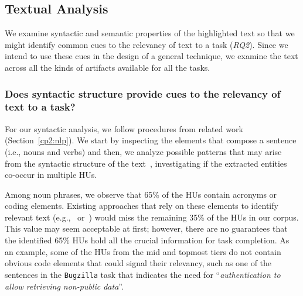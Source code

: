 
\subsection{Textual Analysis}


We examine syntactic and semantic properties 
of the highlighted text so that 
we might identify
common cues to the relevancy of text to a task (\textit{RQ2}).
Since we intend to use these cues 
in the design of a general technique, 
we examine the text across 
all the kinds of artifacts 
available for all the tasks. 




 





\subsubsection{Does syntactic structure provide cues to the relevancy of text to a task?}
\label{cp3:syntactic-analysis}


For our syntactic analysis, we follow procedures from related work (Section~\ref{cp2:nlp}).
We start by inspecting the elements that compose a sentence (i.e., nouns and verbs)
and then, we analyze possible patterns that may arise from the syntactic structure of the text~\cite{Robillard2015},
investigating if the extracted entities co-occur in multiple HUs.






Among noun phrases, we observe that 65\% of the HUs contain acronyms or coding elements.
Existing approaches that rely on these elements to identify relevant text (e.g.,~\cite{Robillard2015} or~\cite{Jiang2016b}) would miss the remaining 35\% of the HUs in our corpus.
This value may seem acceptable at first; however, there are no guarantees that
the identified 65\% HUs hold all the crucial information for task completion.
As an example, some of the HUs from the mid and topmost tiers 
do not contain obvious code elements that could signal their relevancy,
such as one of the sentences in the \texttt{Bugzilla} task that indicates the need for ``\textit{authentication to allow retrieving non-public data}''.





